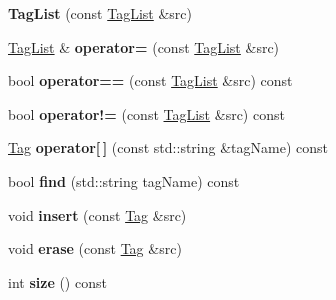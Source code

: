\begin{DoxyCompactItemize}
\item 
\hypertarget{classpgn_1_1TagList_a138bea3185e5069a0d16a3426493069c}{
{\bfseries TagList} (const \hyperlink{classpgn_1_1TagList}{TagList} \&src)}
\label{classpgn_1_1TagList_a138bea3185e5069a0d16a3426493069c}

\item 
\hypertarget{classpgn_1_1TagList_a725e300572d48266a996c54bcf00e7dd}{
\hyperlink{classpgn_1_1TagList}{TagList} \& {\bfseries operator=} (const \hyperlink{classpgn_1_1TagList}{TagList} \&src)}
\label{classpgn_1_1TagList_a725e300572d48266a996c54bcf00e7dd}

\item 
\hypertarget{classpgn_1_1TagList_adc762804ac8495512774c1f6ab271f7b}{
bool {\bfseries operator==} (const \hyperlink{classpgn_1_1TagList}{TagList} \&src) const }
\label{classpgn_1_1TagList_adc762804ac8495512774c1f6ab271f7b}

\item 
\hypertarget{classpgn_1_1TagList_aae0ac1020d8098dbc0036cb7215b2aa7}{
bool {\bfseries operator!=} (const \hyperlink{classpgn_1_1TagList}{TagList} \&src) const }
\label{classpgn_1_1TagList_aae0ac1020d8098dbc0036cb7215b2aa7}

\item 
\hypertarget{classpgn_1_1TagList_af3e01a183cac4b542a193a1c9ab3d71c}{
\hyperlink{classpgn_1_1Tag}{Tag} {\bfseries operator\mbox{[}$\,$\mbox{]}} (const std::string \&tagName) const }
\label{classpgn_1_1TagList_af3e01a183cac4b542a193a1c9ab3d71c}

\item 
\hypertarget{classpgn_1_1TagList_a95b6477f323f26dae4aceee4c447ce35}{
bool {\bfseries find} (std::string tagName) const }
\label{classpgn_1_1TagList_a95b6477f323f26dae4aceee4c447ce35}

\item 
\hypertarget{classpgn_1_1TagList_a2c5141b891374588ee24dc46aaa0aac5}{
void {\bfseries insert} (const \hyperlink{classpgn_1_1Tag}{Tag} \&src)}
\label{classpgn_1_1TagList_a2c5141b891374588ee24dc46aaa0aac5}

\item 
\hypertarget{classpgn_1_1TagList_af40cf43f46c32b832f784e1796b2f579}{
void {\bfseries erase} (const \hyperlink{classpgn_1_1Tag}{Tag} \&src)}
\label{classpgn_1_1TagList_af40cf43f46c32b832f784e1796b2f579}

\item 
\hypertarget{classpgn_1_1TagList_a570c49a96a48a70f71f3fbb8e080f97e}{
int {\bfseries size} () const }
\label{classpgn_1_1TagList_a570c49a96a48a70f71f3fbb8e080f97e}

\end{DoxyCompactItemize}
